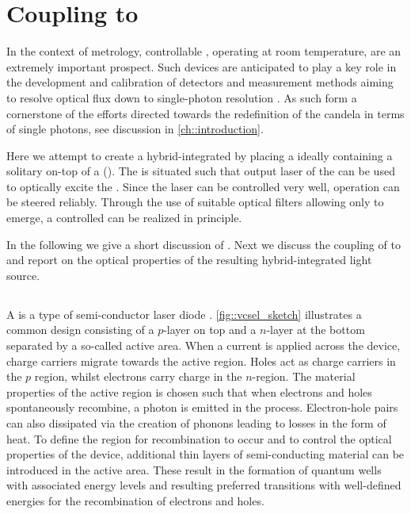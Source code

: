 
\section{Coupling \sivs to \Vcsels} \label{sec::coupling_vcsel}

	In the context of metrology, controllable \spss, operating at room temperature, are an extremely important prospect. Such devices are anticipated to play a key role in the development and calibration of detectors and measurement methods aiming to resolve optical flux down to single-photon resolution \cite{Vaigu2017}. As such \sps form a cornerstone of the efforts directed towards the redefinition of the candela in terms of single photons, see discussion in \autoref{ch::introduction}.

	Here we attempt to create a hybrid-integrated \sps by placing a \nd ideally containing a solitary \sivs on-top of a \vcsels (\VCSELs).
	The \siv is situated such that output laser of the \VCSEL can be used to optically excite the \cc. Since the \VCSEL laser can be controlled very well, \siv operation can be steered reliably. Through the use of suitable optical filters allowing only \siv \fl to emerge, a controlled \sps can be realized in principle.

	In the following we give a short discussion of \VCSELs. Next we discuss the coupling of \sivs to \VCSELs and report on the optical properties of the resulting hybrid-integrated light source.

	\subsection{\Vcsels}\label{subsec::vcsel_structure}

		A \vcsel is a type of semi-conductor laser diode \cite{melngailis1965longitudinal, ibaraki1984pulsed}. \autoref{fig::vcsel_sketch} illustrates a common design consisting of a $p$-layer on top and a $n$-layer at the bottom separated by a so-called active area. When a current is applied across the device, charge carriers migrate towards the active region. Holes act as charge carriers in the $p$ region, whilst electrons carry charge in the $n$-region. The material properties of the active region is chosen such that when electrons and holes spontaneously recombine, a photon is emitted in the process. Electron-hole pairs can also dissipated via the creation of phonons leading to losses in the form of heat. To define the region for recombination to occur and to control the optical properties of the device, additional thin layers of semi-conducting material can be introduced in the active area. These result in the formation of quantum wells with associated energy levels and resulting preferred transitions with well-defined energies for the recombination of electrons and holes.


